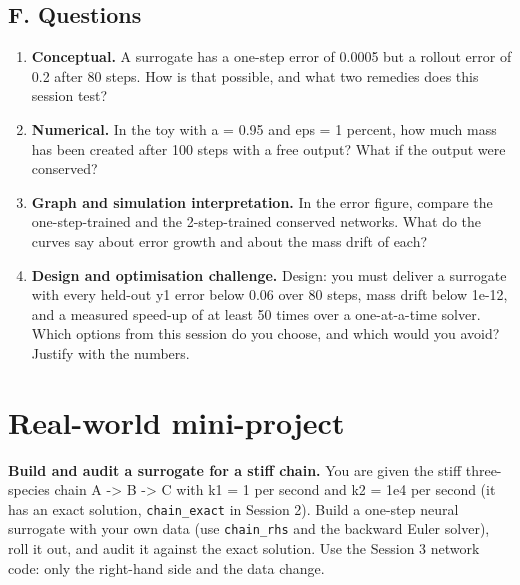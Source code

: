 \documentclass[11pt,a4paper]{article}
\begin{document}
\subsection*{F. Questions}
\begin{enumerate}[nosep]
\item \textbf{Conceptual.} A surrogate has a one-step error of 0.0005 but a rollout error of 0.2 after 80 steps. How is that possible, and what two remedies does this session test?
\item \textbf{Numerical.} In the toy with a = 0.95 and eps = 1 percent, how much mass has been created after 100 steps with a free output? What if the output were conserved?
\item \textbf{Graph and simulation interpretation.} In the error figure, compare the one-step-trained and the 2-step-trained conserved networks. What do the curves say about error growth and about the mass drift of each?
\item \textbf{Design and optimisation challenge.} Design: you must deliver a surrogate with every held-out y1 error below 0.06 over 80 steps, mass drift below 1e-12, and a measured speed-up of at least 50 times over a one-at-a-time solver. Which options from this session do you choose, and which would you avoid? Justify with the numbers.
\end{enumerate}

\section{Real-world mini-project}
\textbf{Build and audit a surrogate for a stiff chain.} You are given the stiff three-species chain A -\textgreater{} B -\textgreater{} C with k1 = 1 per second and k2 = 1e4 per second (it has an exact solution, \texttt{chain\_exact} in Session 2). Build a one-step neural surrogate with your own data (use \texttt{chain\_rhs} and the backward Euler solver), roll it out, and audit it against the exact solution. Use the Session 3 network code: only the right-hand side and the data change.
\end{document}
